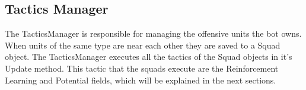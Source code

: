 	\subsection{Tactics Manager}
		The TacticsManager is responsible for managing the offensive units the bot owns. When units of the same type are near each other they are saved 
		to a Squad object. The TacticsManager executes all the tactics of the Squad objects in it's Update method. This tactic that the squads execute 
		are the Reinforcement Learning and Potential fields, which will be explained in the next sections.
		
			
		
			
			
				
			
		